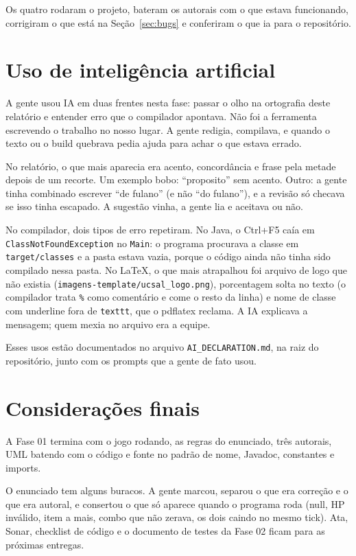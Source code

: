 \documentclass[12pt,oneside,a4paper,article]{abntex2}
\begin{document}
Os quatro rodaram o projeto, bateram os autorais com o que estava
funcionando, corrigiram o que está na Seção~\ref{sec:bugs} e conferiram o
que ia para o repositório.

\section{Uso de inteligência artificial}
\label{sec:ia}

A gente usou IA em duas frentes nesta fase: passar o olho na ortografia
deste relatório e entender erro que o compilador apontava. Não foi a
ferramenta escrevendo o trabalho no nosso lugar. A gente redigia, compilava,
e quando o texto ou o build quebrava pedia ajuda para achar o que estava
errado.

No relatório, o que mais aparecia era acento, concordância e frase pela
metade depois de um recorte. Um exemplo bobo: ``proposito'' sem acento.
Outro: a gente tinha combinado escrever ``de fulano'' (e não ``do fulano''),
e a revisão só checava se isso tinha escapado. A sugestão vinha, a gente
lia e aceitava ou não.

No compilador, dois tipos de erro repetiram. No Java, o Ctrl+F5 caía em
\texttt{ClassNotFoundException} no \texttt{Main}: o programa procurava a
classe em \texttt{target/classes} e a pasta estava vazia, porque o código
ainda não tinha sido compilado nessa pasta. No \LaTeX{}, o que mais
atrapalhou foi arquivo de logo que não existia
(\texttt{imagens-template/ucsal\_logo.png}), porcentagem solta no texto
(o compilador trata \texttt{\%} como comentário e come o resto da linha)
e nome de classe com underline fora de \texttt{texttt}, que o pdflatex
reclama. A IA explicava a mensagem; quem mexia no arquivo era a equipe.

Esses usos estão documentados no arquivo \texttt{AI\_DECLARATION.md}, na
raiz do repositório, junto com os prompts que a gente de fato usou.

\section{Considerações finais}

A Fase 01 termina com o jogo rodando, as regras do enunciado, três autorais, UML
batendo com o código e fonte no padrão de nome, Javadoc, constantes e imports.

O enunciado tem alguns buracos. A gente marcou, separou o que era correção e o que
era autoral, e consertou o que só aparece quando o programa roda (null, HP
inválido, item a mais, combo que não zerava, os dois caindo no mesmo tick).
Ata, Sonar, checklist de código e o documento de testes da Fase 02 ficam
para as próximas entregas.
\end{document}
